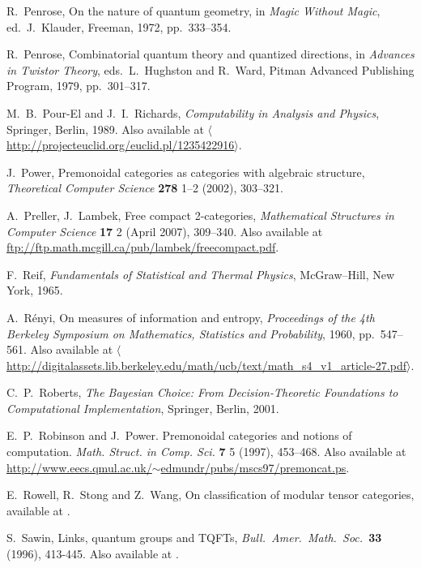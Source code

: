 \documentclass[12pt,twoside,openright]{report}
\begin{document}
\begin{thebibliography}{99}
R.\ Penrose, On the nature of quantum geometry, in \textsl{Magic Without Magic}, ed.\ J.\ Klauder, Freeman, 1972, pp.\ 333--354.

R.\ Penrose, Combinatorial quantum theory and quantized directions, in \textsl{Advances in Twistor Theory}, eds.\ L.\ Hughston and R.\ Ward, Pitman Advanced Publishing Program, 1979, pp.\ 301--317.

 M.\ B.\ Pour-El and J.\ I.\ Richards,
\textsl{Computability in Analysis and Physics}, Springer, Berlin, 1989. Also available at \href{http://projecteuclid.org/euclid.pl/1235422916}
{$\langle$http://projecteuclid.org/euclid.pl/1235422916$\rangle$}.

 J.\ Power, Premonoidal categories as categories with algebraic structure, \textsl{Theoretical Computer Science} \textbf{278} 1--2 (2002), 303--321.

 A.\ Preller, J.\ Lambek, Free compact 2-categories, \textsl{Mathematical Structures in Computer Science} \textbf{17} 2 (April 2007), 309--340.  Also available at \href{ftp://ftp.math.mcgill.ca/pub/lambek/freecompact.pdf}{ftp://ftp.math.mcgill.ca/pub/lambek/freecompact.pdf}.

 F.\ Reif, {\sl Fundamentals of Statistical and Thermal Physics}, McGraw--Hill, New York, 1965.

 A.\ R\'enyi, On measures of information and entropy,
\textsl{Proceedings of the 4th Berkeley Symposium on Mathematics, Statistics and Probability}, 1960, pp.\ 547--561.  Also available at
\href{http://digitalassets.lib.berkeley.edu/math/ucb/text/math_s4_v1_article-27.pdf}
{$\langle$http://digitalassets.lib.berkeley.edu/math/ucb/text/math\_s4\_v1\_article-27.pdf$\rangle$}.

 C.\ P.\ Roberts, 
{\sl The Bayesian Choice: From Decision-Theoretic Foundations to Computational Implementation}, Springer, Berlin, 2001.

 E.\ P.\ Robinson and J.\ Power. Premonoidal categories and notions of computation. \textsl{Math. Struct. in Comp. Sci.} \textbf{7} 5 (1997), 453--468.  Also available at \href{http://www.eecs.qmul.ac.uk/~edmundr/pubs/mscs97/premoncat.ps}{http://www.eecs.qmul.ac.uk/$\sim$edmundr/pubs/mscs97/premoncat.ps}.

 E.\ Rowell, R.\ Stong and Z.\ Wang, On classification of modular tensor categories, available at .

 S.\ Sawin, Links, quantum groups and TQFTs,
{\sl Bull.\ Amer.\ Math.\ Soc.\ }{\bf 33} (1996), 413-445. Also available at .


\end{thebibliography}
\end{document}
